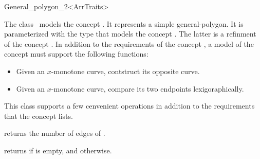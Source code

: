 \ccRefPageBegin

\begin{ccRefClass}{General_polygon_2<ArrTraits>}

\ccThreeToTwo

\ccDefinition
The class \ccRefName\ models the concept .
It represents a simple general-polygon. It is parameterized with the type
 that models the concept
. The latter is a refinment
of the concept . In addition to the
requirements of the concept , a
model of the concept  must
support the following functions:
\begin{itemize}
\item Given an $x$-monotone curve, contstruct its opposite curve.
\item Given an $x$-monotone curve, compare its two endpoints lexigoraphically.
\end{itemize} 

This class supports a few cenvenient operations in addition to the 
requirements that the concept  lists.

 
\ccTypes



\ccCreation
{}

% 
% 

\ccOperations
 {returns the number of edges of \ccVar.}

\ccModifiers


\ccPredicates
{returns  if \ccVar is empty, and  otherwise.}



\ccIsModel

\end{ccRefClass}
\ccRefPageEnd
